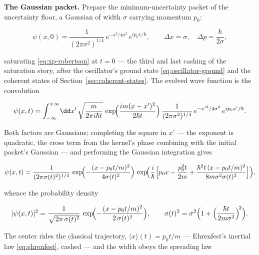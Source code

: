 \medskip\noindent\textbf{The Gaussian packet.} Prepare the minimum-uncertainty packet of the uncertainty floor, a Gaussian of width $\sigma$ carrying momentum $p_0$:
\begin{linenomath}
    \begin{equation*}
        \psi(x, 0) = \frac{1}{(2\pi\sigma^2)^{1/4}}\,e^{-x^2/4\sigma^2}\,e^{ip_0 x/\hbar},
        \qquad
        \Delta x = \sigma, \quad \Delta p = \frac{\hbar}{2\sigma} ,
    \end{equation*}
\end{linenomath}
saturating \eqref{eq:xp-robertson} at $t = 0$ --- the third and last cashing of the saturation story, after the oscillator's ground state \eqref{eq:oscillator-ground} and the coherent states of Section~\ref{sec:coherent-states}. The evolved wave function is the convolution
\begin{linenomath}
    \begin{equation*}
        \psi(x, t) = \int_{-\infty}^{+\infty}\!\dd x'\,
        \sqrt{\frac{m}{2\pi i\hbar t}}\,
        \exp\!\Bigl(\frac{im(x-x')^2}{2\hbar t}\Bigr)\,
        \frac{1}{(2\pi\sigma^2)^{1/4}}\,
        e^{-x'^2/4\sigma^2}\,e^{ip_0 x'/\hbar}.
    \end{equation*}
\end{linenomath}
Both factors are Gaussians; completing the square in $x'$ --- the exponent is quadratic, the cross term from the kernel's phase combining with the initial packet's Gaussian --- and performing the Gaussian integration gives
\begin{linenomath}
    \begin{equation*}
        \psi(x,t)=\frac{1}{(2\pi\sigma(t)^2)^{1/4}}\,
        \exp\!\Bigl(-\frac{(x-p_0 t/m)^2}{4\sigma(t)^2}\Bigr)\,
        \exp\!\Bigl(\frac{i}{\hbar}\Bigl[p_0 x-\frac{p_0^2 t}{2m}
        +\frac{\hbar^2 t\,(x-p_0 t/m)^2}{8m\sigma^2\sigma(t)^2}\Bigr]\Bigr),
    \end{equation*}
\end{linenomath}
whence the probability density
\begin{linenomath}
    \begin{equation*}
        |\psi(x, t)|^2 = \frac{1}{\sqrt{2\pi\,\sigma(t)^2}}\,\exp\!\Bigl(-\frac{(x - p_0 t/m)^2}{2\,\sigma(t)^2}\Bigr),
        \qquad
        \sigma(t)^2 = \sigma^2\Bigl(1 + \Bigl(\frac{\hbar t}{2m\sigma^2}\Bigr)^{\!2}\Bigr) .
    \end{equation*}
\end{linenomath}
The center rides the classical trajectory, $\langle x\rangle(t) = p_0 t/m$ --- Ehrenfest's inertial law \eqref{eq:ehrenfest}, cashed --- and the width obeys the spreading law
